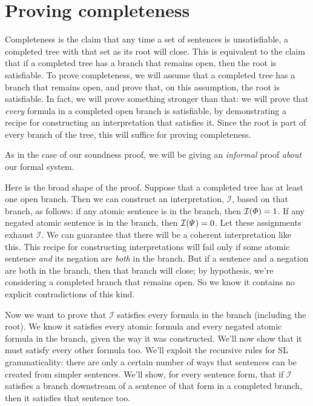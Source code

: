 \section{Proving completeness}
\label{sec.completenessproof}
Completeness is the claim that any time a set of sentences is unsatisfiable, a completed tree with that set as its root will close. This is equivalent to the claim that if a completed tree has a branch that remains open, then the root is satisfiable. To prove completeness, we will assume that a completed tree has a branch that remains open, and prove that, on this assumption, the root is satisfiable. In fact, we will prove something stronger than that: we will prove that \emph{every} formula in a completed open branch is satisfiable, by demonstrating a recipe for constructing an interpretation that satisfies it. Since the root is part of every branch of the tree, this will suffice for proving completeness.

As in the case of our soundness proof, we will be giving an \emph{informal} proof \emph{about} our formal system.

Here is the broad shape of the proof. Suppose that a completed tree has at least one open branch. Then we can construct an interpretation, $\mathcal{I}$, based on that branch, as follows: if any atomic sentence \metaA{} is in the branch, then $\mathcal{I}(\varPhi{})=1$. If any negated atomic sentence \enot\metaB{} is in the branch, then $\mathcal{I}(\varPsi{})=0$. Let these assignments exhaust $\mathcal{I}$. We can guarantee that there will be a coherent interpretation like this. This recipe for constructing interpretations will fail only if some atomic sentence \emph{and} its negation are \emph{both} in the branch. But if a sentence and a negation are both in the branch, then that branch will close; by hypothesis, we're considering a completed branch that remains open. So we know it contains no explicit contradictions of this kind.

Now we want to prove that $\mathcal{I}$ satisfies every formula in the branch (including the root). We know it satisfies every atomic formula and every negated atomic formula in the branch, given the way it was constructed. We'll now show that it must satisfy every other formula too. We'll exploit the recursive rules for SL grammaticality: there are only a certain number of ways that sentences can be created from simpler sentences. We'll show, for every sentence form, that if $\mathcal{I}$ satisfies a branch downstream of a sentence of that form in a completed branch, then it satisfies that sentence too.

